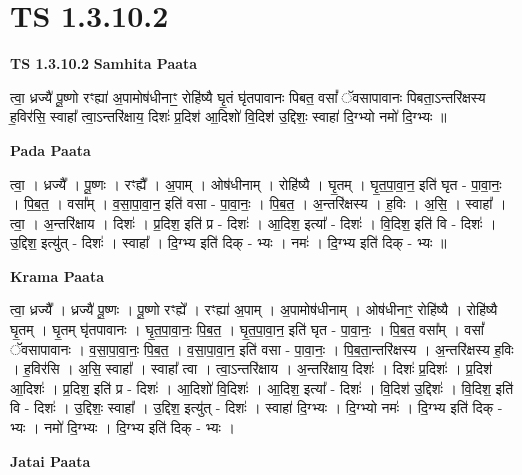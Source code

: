 \documentclass[17pt]{extarticle}
\begin{document}
\section*{ TS 1.3.10.2 }

\textbf{TS 1.3.10.2 } \newline
\textbf{Samhita Paata} \newline

त्वा॒ ध्रज्यै॑ पू॒ष्णो रꣳह्या॑ अ॒पामोष॑धीनाꣳ॒॒ रोहि॑ष्यै घृ॒तं घृ॑तपावानः पिबत॒ वसां᳚ ॅवसापावानः पिबता॒ऽन्तरि॑क्षस्य ह॒विर॑सि॒ स्वाहा᳚ त्वा॒ऽन्तरि॑क्षाय॒ दिशः॑ प्र॒दिश॑ आ॒दिशो॑ वि॒दिश॑ उ॒द्दिशः॒ स्वाहा॑ दि॒ग्भ्यो नमो॑ दि॒ग्भ्यः ॥ \newline

\textbf{Pada Paata} \newline

त्वा॒ । ध्रज्यै᳚ । पू॒ष्णः । रꣳह्यै᳚ । अ॒पाम् । ओष॑धीनाम् । रोहि॑ष्यै । घृ॒तम् । घृ॒त॒पा॒वा॒न॒ इति॑ घृत - पा॒वा॒नः॒ । पि॒ब॒त॒ । वसा᳚म् । व॒सा॒पा॒वा॒न॒ इति॑ वसा - पा॒वा॒नः॒ । पि॒ब॒त॒ । अ॒न्तरि॑क्षस्य । ह॒विः । अ॒सि॒ । स्वाहा᳚ । त्वा॒ । अ॒न्तरि॑क्षाय । दिशः॑ । प्र॒दिश॒ इति॑ प्र - दिशः॑ । आ॒दिश॒ इत्या᳚ - दिशः॑ । वि॒दिश॒ इति॑ वि - दिशः॑ । उ॒द्दिश॒ इत्यु॑त् - दिशः॑ । स्वाहा᳚ । दि॒ग्भ्य इति॑ दिक् - भ्यः । नमः॑ । दि॒ग्भ्य इति॑ दिक् - भ्यः ॥  \newline


\textbf{Krama Paata} \newline

त्वा॒ ध्रज्यै᳚ । ध्रज्यै॑ पू॒ष्णः । पू॒ष्णो रꣳह्ये᳚ । रꣳह्या॑ अ॒पाम् । अ॒पामोष॑धीनाम् । ओष॑धीनाꣳ॒॒ रोहि॑ष्यै । रोहि॑ष्यै घृ॒तम् । घृ॒तम् घृ॑तपावानः । घृ॒त॒पा॒वा॒नः॒ पि॒ब॒त॒ । घृ॒त॒पा॒वा॒न॒ इति॑ घृत - पा॒वा॒नः॒ । पि॒ब॒त॒ वसा᳚म् । वसां᳚ ॅवसापावानः । व॒सा॒पा॒वा॒नः॒ पि॒ब॒त॒ । व॒सा॒पा॒वा॒न॒ इति॑ वसा - पा॒वा॒नः॒ । पि॒ब॒ता॒न्तरि॑क्षस्य । अ॒न्तरि॑क्षस्य ह॒विः । ह॒विर॑सि । अ॒सि॒ स्वाहा᳚ । स्वाहा᳚ त्वा । त्वा॒ऽन्तरि॑क्षाय । अ॒न्तरि॑क्षाय॒ दिशः॑ । दिशः॑ प्र॒दिशः॑ । प्र॒दिश॑ आ॒दिशः॑ । प्र॒दिश॒ इति॑ प्र - दिशः॑ । आ॒दिशो॑ वि॒दिशः॑ । आ॒दिश॒ इत्या᳚ - दिशः॑ । वि॒दिश॑ उ॒द्दिशः॑ । वि॒दिश॒ इति॑ वि - दिशः॑ । उ॒द्दिशः॒ स्वाहा᳚ । उ॒द्दिश॒ इत्यु॑त् - दिशः॑ । स्वाहा॑ दि॒ग्भ्यः । दि॒ग्भ्यो नमः॑ । दि॒ग्भ्य इति॑ दिक् - भ्यः । नमो॑ दि॒ग्भ्यः । दि॒ग्भ्य इति॑ दिक् - भ्यः । \newline

\textbf{Jatai Paata} \newline
\end{document}
